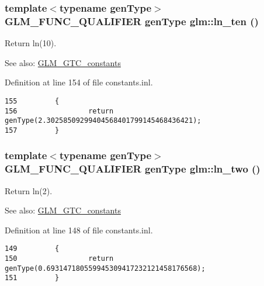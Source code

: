 \hypertarget{group__gtc__constants_g8b4f9e44073d823e00294592d295d0f1}{
\subsubsection[ln\_\-ten]{\setlength{\rightskip}{0pt plus 5cm}template$<$typename genType$>$ GLM\_\-FUNC\_\-QUALIFIER genType glm::ln\_\-ten ()}}
\label{group__gtc__constants_g8b4f9e44073d823e00294592d295d0f1}


Return ln(10). \begin{Desc}
\item[See also:]\hyperlink{group__gtc__constants}{GLM\_\-GTC\_\-constants} \end{Desc}


Definition at line 154 of file constants.inl.

\begin{Code}\begin{verbatim}155         {
156                 return genType(2.30258509299404568401799145468436421);
157         }
\end{verbatim}
\end{Code}


\hypertarget{group__gtc__constants_g1d237e2d94b69cdf1122ae8cbb561b2d}{
\subsubsection[ln\_\-two]{\setlength{\rightskip}{0pt plus 5cm}template$<$typename genType$>$ GLM\_\-FUNC\_\-QUALIFIER genType glm::ln\_\-two ()}}
\label{group__gtc__constants_g1d237e2d94b69cdf1122ae8cbb561b2d}


Return ln(2). \begin{Desc}
\item[See also:]\hyperlink{group__gtc__constants}{GLM\_\-GTC\_\-constants} \end{Desc}


Definition at line 148 of file constants.inl.

\begin{Code}\begin{verbatim}149         {
150                 return genType(0.693147180559945309417232121458176568);
151         }
\end{verbatim}
\end{Code}


